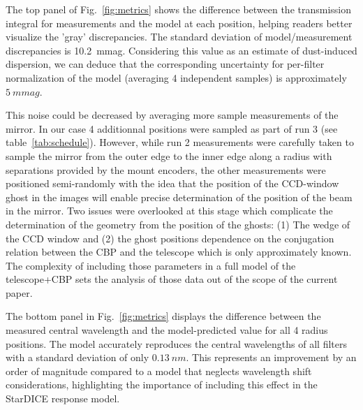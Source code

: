 The top panel of Fig.~\ref{fig:metrics} shows the difference between
the transmission integral for measurements and the model at each
position, helping readers better visualize the 'gray'
discrepancies. The standard deviation of model/measurement
discrepancies is \SI{10.2}{mmag}. Considering this value as an
estimate of dust-induced dispersion, we can deduce that the
corresponding uncertainty for per-filter normalization of the model
(averaging 4 independent samples) is approximately $\SI{5}{mmag}$.

This noise could be decreased by averaging more sample measurements of
the mirror. In our case 4 additionnal positions were sampled as part
of run 3 (see table~\ref{tab:schedule}). However, while run 2
measurements were carefully taken to sample the mirror from the outer
edge to the inner edge along a radius with separations provided by the
mount encoders, the other measurements were positioned semi-randomly
with the idea that the position of the CCD-window ghost in the images
will enable precise determination of the position of the beam in the
mirror. Two issues were overlooked at this stage which complicate the
determination of the geometry from the position of the ghosts: (1) The
wedge of the CCD window and (2) the ghost positions dependence on the
conjugation relation between the CBP and the telescope which is only
approximately known. The complexity of including those parameters in a
full model of the telescope+CBP sets the analysis of those data out of
the scope of the current paper.

The bottom panel in Fig.~\ref{fig:metrics} displays the difference
between the measured central wavelength and the model-predicted value
for all 4 radius positions. The model accurately reproduces the
central wavelengths of all filters with a standard deviation of only
$\SI{0.13}{nm}$. This represents an improvement by an order of
magnitude compared to a model that neglects wavelength shift
considerations, highlighting the importance of including this effect
in the StarDICE response model.

